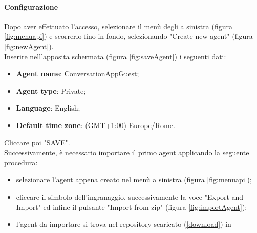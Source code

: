 \paragraph{Configurazione}
Dopo aver effettuato l'accesso, selezionare il menù degli  a sinistra (figura \ref{fig:menuapi}) e scorrerlo fino in fondo, selezionando "Create new agent" (figura \ref{fig:newAgent}). \\

Inserire nell'apposita schermata (figura \ref{fig:saveAgent}) i seguenti dati:
\begin{itemize}
	\item \textbf{Agent name}: ConversationAppGuest;
	\item \textbf{Agent type}: Private;
	\item \textbf{Language}: English;
	\item \textbf{Default time zone}: (GMT+1:00) Europe/Rome.
\end{itemize}
Cliccare poi "SAVE".\\
Successivamente, è necessario importare il primo agent applicando la seguente procedura:
\begin{itemize}
	\item selezionare l'agent appena creato nel menù a sinistra (figura \ref{fig:menuapi});
	\item cliccare il simbolo dell'ingranaggio, successivamente la voce "Export and Import" ed infine il pulsante "Import from zip" (figura \ref{fig:importAgent});
	\item l'agent da importare si trova nel repository scaricato (\ref{download}) in\\ 
\end{itemize}


